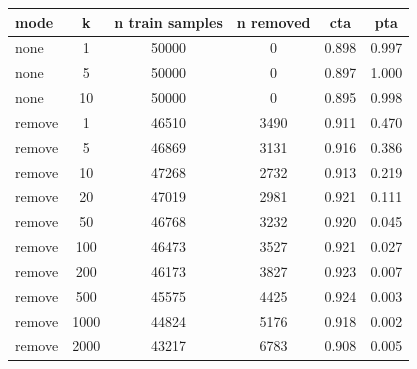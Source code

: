 \begin{tabular}{lccccc}
\toprule
mode & k & n train samples & n removed & cta & pta \\
\midrule
none & 1 & 50000 & 0 & 0.898 & 0.997 \\
none & 5 & 50000 & 0 & 0.897 & 1.000 \\
none & 10 & 50000 & 0 & 0.895 & 0.998 \\
remove & 1 & 46510 & 3490 & 0.911 & 0.470 \\
remove & 5 & 46869 & 3131 & 0.916 & 0.386 \\
remove & 10 & 47268 & 2732 & 0.913 & 0.219 \\
remove & 20 & 47019 & 2981 & 0.921 & 0.111 \\
remove & 50 & 46768 & 3232 & 0.920 & 0.045 \\
remove & 100 & 46473 & 3527 & 0.921 & 0.027 \\
remove & 200 & 46173 & 3827 & 0.923 & 0.007 \\
remove & 500 & 45575 & 4425 & 0.924 & 0.003 \\
remove & 1000 & 44824 & 5176 & 0.918 & 0.002 \\
remove & 2000 & 43217 & 6783 & 0.908 & 0.005 \\
\bottomrule
\end{tabular}
